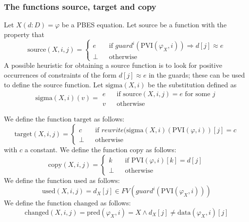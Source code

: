 \subsubsection{The functions source, target and copy}

Let $X(d:D)=\varphi $ be a PBES equation. Let $\mathrm{source}$ be a
function with the property that 
\begin{equation*}
\mathrm{source}(X,i,j)=\left\{ 
\begin{array}{lll}
e &  & \text{if }guard^{i}(\mathrm{PVI}(\varphi _{X},i))\Rightarrow
d[j]\approx e \\ 
\bot &  & \text{otherwise}%
\end{array}%
\right.
\end{equation*}%
A possible heuristic for obtaining a source function is to look for positive
occurrences of constraints of the form $d[j]\approx e$ in the guards; these
can be used to define the source function. Let $\mathrm{sigma}(X,i)$ be the
substitution defined as%
\begin{equation*}
\mathrm{sigma}(X,i)(v)=%
\begin{array}{lll}
e &  & \text{if }\mathrm{source}(X,i,j)=e\text{ for some }j \\ 
v &  & \text{otherwise}%
\end{array}%
\end{equation*}

We define the function $\mathrm{target}$ as follows:%
\begin{equation*}
\mathrm{target}(X,i,j)=\left\{ 
\begin{array}{lll}
c &  & \text{if }rewrite(\mathrm{sigma}(X,i)(\mathrm{PVI}(\varphi ,i))[j]=c
\\ 
\bot &  & \text{otherwise}%
\end{array}%
\right.
\end{equation*}%
with $c$ a constant. We define the function $\mathrm{copy}$ as follows:%
\begin{equation*}
\mathrm{copy}(X,i,j)=\left\{ 
\begin{array}{lll}
k &  & \text{if }\mathrm{PVI}(\varphi ,i)[k]=d[j] \\ 
\bot &  & \text{otherwise}%
\end{array}%
\right.
\end{equation*}%
We define the function $\mathrm{used}$ as follows:%
\begin{equation*}
\mathrm{used}(X,i,j)=d_{X}[j]\in FV(guard^{i}(\mathrm{PVI}(\varphi _{X},i)))
\end{equation*}%
We define the function $\mathrm{changed}$ as follows:%
\begin{equation*}
\mathrm{changed}(X,i,j)=\mathrm{pred}(\varphi _{X},i)=X\wedge d_{X}[j]\neq 
\mathrm{data}(\varphi _{X},i)[j]
\end{equation*}

